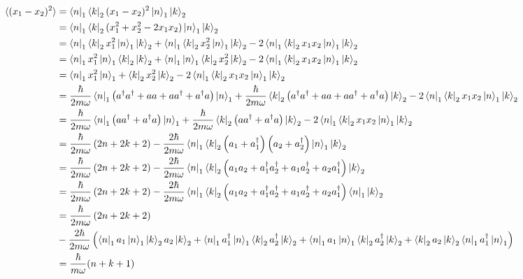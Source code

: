 \documentclass[10pt]{article} %
\begin{document}
\begin{align*}
  \braket{(x_1-x_2)^2} &= \bra{n}_1\bra{k}_2(x_1-x_2)^2\ket{n}_1\ket{k}_2\\
  &= \bra{n}_1\bra{k}_2(x_1^2 + x_2^2 - 2x_1x_2)\ket{n}_1\ket{k}_2\\
  &= \bra{n}_1\bra{k}_2x_1^2\ket{n}_1\ket{k}_2 +
  \bra{n}_1\bra{k}_2x_2^2\ket{n}_1\ket{k}_2 - 2\bra{n}_1\bra{k}_2x_1x_2\ket{n}_1\ket{k}_2\\
  &= \bra{n}_1x_1^2\ket{n}_1\bra{k}_2\ket{k}_2 +
  \bra{n}_1\ket{n}_1\bra{k}_2x_2^2\ket{k}_2 - 2\bra{n}_1\bra{k}_2x_1x_2\ket{n}_1\ket{k}_2\\
  &= \bra{n}_1x_1^2\ket{n}_1 + \bra{k}_2x_2^2\ket{k}_2
  - 2\bra{n}_1\bra{k}_2x_1x_2\ket{n}_1\ket{k}_2\\
  &= \frac{\hbar}{2m\omega}\bra{n}_1
  \left(a^\dagger a^\dagger + aa + aa^\dagger + a^\dagger a\right)\ket{n}_1
  + \frac{\hbar}{2m\omega}\bra{k}_2
  \left(a^\dagger a^\dagger + aa + aa^\dagger + a^\dagger a\right)\ket{k}_2
  - 2\bra{n}_1\bra{k}_2x_1x_2\ket{n}_1\ket{k}_2\\
  &= \frac{\hbar}{2m\omega}\bra{n}_1\left(aa^\dagger + a^\dagger a\right)\ket{n}_1
  + \frac{\hbar}{2m\omega}\bra{k}_2\left(aa^\dagger + a^\dagger a\right)\ket{k}_2
  - 2\bra{n}_1\bra{k}_2x_1x_2\ket{n}_1\ket{k}_2\\
  &= \frac{\hbar}{2m\omega}\left(2n + 2k + 2\right)
  - \frac{2\hbar}{2m\omega}\bra{n}_1\bra{k}_2
  \left(a_1+a_1^\dagger\right)\left(a_2+a_2^\dagger\right)\ket{n}_1\ket{k}_2\\
  &= \frac{\hbar}{2m\omega}\left(2n + 2k + 2\right)
  - \frac{2\hbar}{2m\omega}\bra{n}_1\bra{k}_2
  \left(a_1a_2 + a_1^\dagger a_2^\dagger + a_1a_2^\dagger + a_2a_1^\dagger\right)\ket{k}_2\\
  &= \frac{\hbar}{2m\omega}\left(2n + 2k + 2\right)
  - \frac{2\hbar}{2m\omega}\bra{n}_1\bra{k}_2
  \left(a_1a_2 + a_1^\dagger a_2^\dagger + a_1a_2^\dagger + a_2a_1^\dagger\right)\bra{n}_1\ket{k}_2\\
  &= \frac{\hbar}{2m\omega}\left(2n + 2k + 2\right)\\
  &- \frac{2\hbar}{2m\omega}
  \left(\bra{n}_1a_1\ket{n}_1\ket{k}_2a_2\ket{k}_2
  + \bra{n}_1a_1^\dagger\ket{n}_1\bra{k}_2a_2^\dagger\ket{k}_2
  + \bra{n}_1a_1\ket{n}_1\bra{k}_2a_2^\dagger\ket{k}_2
  + \bra{k}_2a_2\ket{k}_2\bra{n}_1a_1^\dagger\ket{n}_1\right)\\
  &= \frac{\hbar}{m\omega}(n+k+1)\\
\end{align*}
\end{document}
